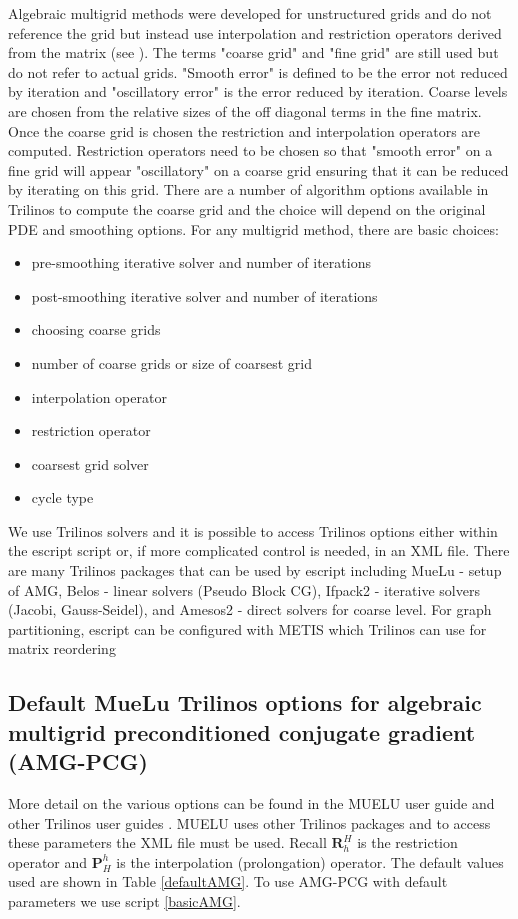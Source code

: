 Algebraic multigrid methods were developed for unstructured grids and do not reference the grid but instead use interpolation and restriction operators derived from the matrix (see \cite{Briggs2000, Stuben2001281, Vanek1996, Tuminaro2000}).  The terms "coarse grid" and "fine grid" are still used but do not refer to actual grids.  "Smooth error" is defined to be the error not reduced by iteration and "oscillatory error" is the error reduced by iteration.  Coarse levels are chosen from the relative sizes of the off diagonal terms in the fine matrix.
Once the coarse grid is chosen the restriction and interpolation operators are computed. Restriction operators need to be chosen so that "smooth error" on a fine grid will appear "oscillatory" on a coarse grid ensuring that it can be reduced by iterating on this grid. There are a number of algorithm options available in Trilinos to compute the coarse grid and the choice will depend on the original PDE and smoothing options. For any multigrid method, there are basic choices: 
\begin{itemize}%
    \item pre-smoothing iterative solver and number of iterations 
    \item post-smoothing iterative solver and number of iterations
    \item choosing coarse grids    
    \item number of coarse grids or size of coarsest grid
    \item interpolation operator
    \item restriction operator
    \item coarsest grid solver
    \item cycle type 
\end{itemize}
We use Trilinos solvers and it is possible to access Trilinos options either within the escript script or, if more complicated control is needed, in an XML file. There are many Trilinos packages that can be used by escript including
MueLu - setup of AMG, Belos - linear solvers (Pseudo Block CG), Ifpack2 - iterative solvers (Jacobi, Gauss-Seidel), and Amesos2 - direct solvers for coarse level.  For graph partitioning, escript can be configured with METIS which Trilinos can use for matrix reordering


\subsection{Default MueLu Trilinos options for algebraic multigrid preconditioned conjugate gradient (AMG-PCG)}
More detail on the various options can be found in the MUELU user guide and other Trilinos user guides \cite{TrilinosWeb}. MUELU uses other Trilinos packages and to access these parameters the XML file must be used.  
Recall $\mathbf{R}_h^H$ is the restriction operator and $\mathbf{P}^h_H$ is the interpolation (prolongation) operator.  The default values used are shown in Table \ref{defaultAMG}.  To use AMG-PCG with default parameters we use script \ref{basicAMG}. 

